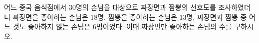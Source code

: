 어느 중국 음식점에서 $30$명의 손님을 대상으로 짜장면과 짬뽕의 선호도를 조사하였더니 짜장면을 좋아하는 손님은 $18$명, 짬뽕을 좋아하는 손님은 $13$명, 짜장면과 짬뽕 중 어느 것도 좋아하지 않는 손님은 $6$명이었다. 이때 짜장면만 좋아하는 손님의 수를 구하시오.
